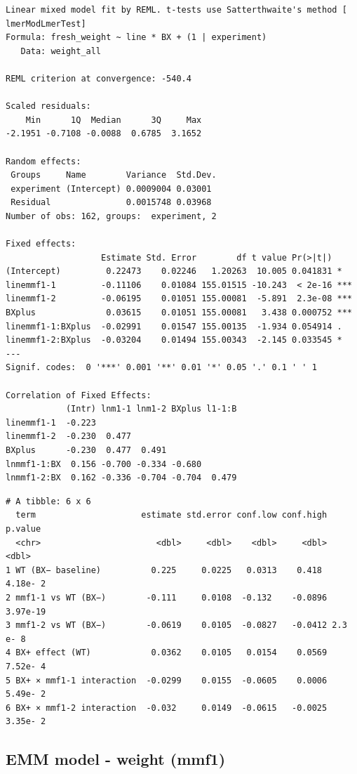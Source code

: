 \documentclass[
  10pt,
]{article}
\begin{document}
\begin{verbatim}
Linear mixed model fit by REML. t-tests use Satterthwaite's method [
lmerModLmerTest]
Formula: fresh_weight ~ line * BX + (1 | experiment)
   Data: weight_all

REML criterion at convergence: -540.4

Scaled residuals: 
    Min      1Q  Median      3Q     Max 
-2.1951 -0.7108 -0.0088  0.6785  3.1652 

Random effects:
 Groups     Name        Variance  Std.Dev.
 experiment (Intercept) 0.0009004 0.03001 
 Residual               0.0015748 0.03968 
Number of obs: 162, groups:  experiment, 2

Fixed effects:
                   Estimate Std. Error        df t value Pr(>|t|)    
(Intercept)         0.22473    0.02246   1.20263  10.005 0.041831 *  
linemmf1-1         -0.11106    0.01084 155.01515 -10.243  < 2e-16 ***
linemmf1-2         -0.06195    0.01051 155.00081  -5.891  2.3e-08 ***
BXplus              0.03615    0.01051 155.00081   3.438 0.000752 ***
linemmf1-1:BXplus  -0.02991    0.01547 155.00135  -1.934 0.054914 .  
linemmf1-2:BXplus  -0.03204    0.01494 155.00343  -2.145 0.033545 *  
---
Signif. codes:  0 '***' 0.001 '**' 0.01 '*' 0.05 '.' 0.1 ' ' 1

Correlation of Fixed Effects:
            (Intr) lnm1-1 lnm1-2 BXplus l1-1:B
linemmf1-1  -0.223                            
linemmf1-2  -0.230  0.477                     
BXplus      -0.230  0.477  0.491              
lnmmf1-1:BX  0.156 -0.700 -0.334 -0.680       
lnmmf1-2:BX  0.162 -0.336 -0.704 -0.704  0.479
\end{verbatim}

\begin{verbatim}
# A tibble: 6 x 6
  term                     estimate std.error conf.low conf.high  p.value
  <chr>                       <dbl>     <dbl>    <dbl>     <dbl>    <dbl>
1 WT (BX− baseline)          0.225     0.0225   0.0313    0.418  4.18e- 2
2 mmf1-1 vs WT (BX−)        -0.111     0.0108  -0.132    -0.0896 3.97e-19
3 mmf1-2 vs WT (BX−)        -0.0619    0.0105  -0.0827   -0.0412 2.3 e- 8
4 BX+ effect (WT)            0.0362    0.0105   0.0154    0.0569 7.52e- 4
5 BX+ × mmf1-1 interaction  -0.0299    0.0155  -0.0605    0.0006 5.49e- 2
6 BX+ × mmf1-2 interaction  -0.032     0.0149  -0.0615   -0.0025 3.35e- 2
\end{verbatim}

\subsection{EMM model - weight (mmf1)}\label{emm-model---weight-mmf1}
\end{document}
